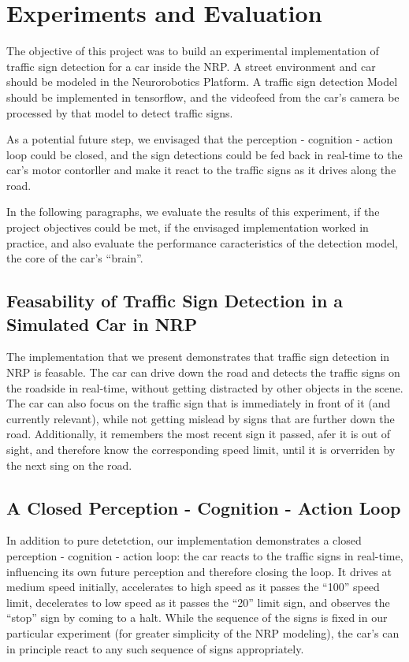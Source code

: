 
\section{Experiments and Evaluation}

The objective of this project was to build an experimental implementation of traffic sign detection for a car inside the NRP. 
A street environment and car should be modeled in the Neurorobotics Platform. A traffic sign detection Model should be implemented in tensorflow, and the videofeed from the car's camera be processed by that model to detect traffic signs.

As a potential future step, we envisaged that the perception - cognition - action loop could be closed, and the sign detections could be fed back in real-time to the car's motor contorller and make it react to the traffic signs as it drives along the road.

In the following paragraphs, we evaluate the results of this experiment, if the project objectives could be met, if the envisaged implementation worked in practice, and also evaluate the performance caracteristics of the detection model, the core of the car's ``brain''.

\subsection{Feasability of Traffic Sign Detection in a Simulated Car in NRP}
The implementation that we present demonstrates that traffic sign detection in NRP is feasable. 
The car can drive down the road and detects the traffic signs on the roadside in real-time, without getting distracted by other objects in the scene. 
The car can also focus on the traffic sign that is immediately in front of it (and currently relevant), while not getting mislead by signs that are further down the road. 
Additionally, it remembers the most recent sign it passed, afer it is out of sight, and therefore know the corresponding speed limit, until it is orverriden by the next sing on the road.

\subsection{A Closed Perception - Cognition - Action Loop}
In addition to pure detetction, our implementation demonstrates a closed perception - cognition - action loop: 
the car reacts to the traffic signs in real-time, influencing its own future perception and therefore closing the loop. 
It drives at medium speed initially, accelerates to high speed as it passes the ``100'' speed limit, decelerates to low speed as it passes the ``20'' limit sign, and observes the ``stop'' sign by coming to a halt. 
While the sequence of the signs is fixed in our particular experiment (for greater simplicity of the NRP modeling), the car's can in principle react to any such sequence of signs appropriately.

